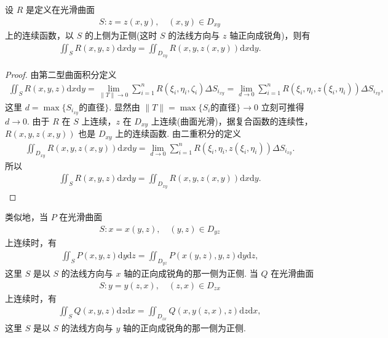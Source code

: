 \documentclass[../../main.tex]{subfiles}%
\begin{document}
\begin{theorem}
设 $R$ 是定义在光滑曲面
\begin{align*}
S: z = z(x,y), \quad (x,y) \in D_{xy}
\end{align*}
上的连续函数，以 $S$ 的上侧为正侧(这时 $S$ 的法线方向与 $z$ 轴正向成锐角)，则有
\begin{align}
\iint_S R(x,y,z) \mathrm{d}x\mathrm{d}y = \iint_{D_{xy}} R(x,y,z(x,y)) \mathrm{d}x\mathrm{d}y. \label{eq:22-2}
\end{align}
\end{theorem}
\begin{proof}
由第二型曲面积分定义
\begin{align*}
\iint_S R(x,y,z) \mathrm{d}x\mathrm{d}y = \lim\limits_{\|T\|\to 0} \sum\limits_{i=1}^n R(\xi_i, \eta_i, \zeta_i) \Delta S_{i_{xy}} = \lim\limits_{d\to 0} \sum\limits_{i=1}^n R(\xi_i, \eta_i, z(\xi_i, \eta_i)) \Delta S_{i_{xy}},
\end{align*}
这里 $d = \max \{S_{i_{xy}} \text{的直径}\}$. 显然由 $\|T\| = \max \{S_i \text{的直径}\} \to 0$ 立刻可推得 $d \to 0$. 由于 $R$ 在 $S$ 上连续，$z$ 在 $D_{xy}$ 上连续(曲面光滑)，据复合函数的连续性，$R(x,y,z(x,y))$ 也是 $D_{xy}$ 上的连续函数. 由二重积分的定义
\begin{align*}
\iint_{D_{xy}} R(x,y,z(x,y)) \mathrm{d}x\mathrm{d}y = \lim\limits_{d\to 0} \sum\limits_{i=1}^n R(\xi_i, \eta_i, z(\xi_i, \eta_i)) \Delta S_{i_{xy}}.
\end{align*}
所以
\begin{align*}
\iint_S R(x,y,z) \mathrm{d}x\mathrm{d}y = \iint_{D_{xy}} R(x,y,z(x,y)) \mathrm{d}x\mathrm{d}y.
\end{align*}
\end{proof}

\begin{corollary}
类似地，当 $P$ 在光滑曲面
\begin{align*}
S: x = x(y,z), \quad (y,z) \in D_{yz}
\end{align*}
上连续时，有
\begin{align}
\iint_S P(x,y,z) \mathrm{d}y\mathrm{d}z = \iint_{D_{yz}} P(x(y,z), y, z) \mathrm{d}y\mathrm{d}z, \label{eq:22-3}
\end{align}
这里 $S$ 是以 $S$ 的法线方向与 $x$ 轴的正向成锐角的那一侧为正侧. 当 $Q$ 在光滑曲面
\begin{align*}
S: y = y(z,x), \quad (z,x) \in D_{zx}
\end{align*}
上连续时，有
\begin{align}
\iint_S Q(x,y,z) \mathrm{d}z\mathrm{d}x = \iint_{D_{zx}} Q(x, y(z,x), z) \mathrm{d}z\mathrm{d}x, \label{eq:22-4}
\end{align}
这里 $S$ 是以 $S$ 的法线方向与 $y$ 轴的正向成锐角的那一侧为正侧.
\end{corollary}
\end{document}

